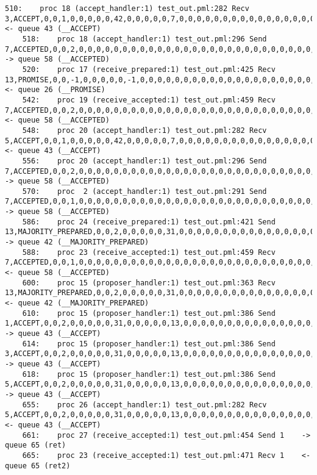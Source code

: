 \begin{lstlisting}[xleftmargin=.01\linewidth, xrightmargin=0.01\linewidth, caption={Message passing caused by the proposer's protocol bug.}, label={lst:paxos_bug}]
    510:    proc 18 (accept_handler:1) test_out.pml:282 Recv 3,ACCEPT,0,0,1,0,0,0,0,0,42,0,0,0,0,0,7,0,0,0,0,0,0,0,0,0,0,0,0,0,0,0,0,0,0,0,0,0      <- queue 43 (__ACCEPT)
    518:    proc 18 (accept_handler:1) test_out.pml:296 Send 7,ACCEPTED,0,0,2,0,0,0,0,0,0,0,0,0,0,0,0,0,0,0,0,0,0,0,0,0,0,0,0,0,0,0,0,0,0,0,0,0     -> queue 58 (__ACCEPTED)
    520:    proc 17 (receive_prepared:1) test_out.pml:425 Recv 13,PROMISE,0,0,-1,0,0,0,0,0,-1,0,0,0,0,0,0,0,0,0,0,0,0,0,0,0,0,0,0,0,0,0,0,0,0,0,0,0 <- queue 26 (__PROMISE)
    542:    proc 19 (receive_accepted:1) test_out.pml:459 Recv 7,ACCEPTED,0,0,2,0,0,0,0,0,0,0,0,0,0,0,0,0,0,0,0,0,0,0,0,0,0,0,0,0,0,0,0,0,0,0,0,0   <- queue 58 (__ACCEPTED)
    548:    proc 20 (accept_handler:1) test_out.pml:282 Recv 5,ACCEPT,0,0,1,0,0,0,0,0,42,0,0,0,0,0,7,0,0,0,0,0,0,0,0,0,0,0,0,0,0,0,0,0,0,0,0,0      <- queue 43 (__ACCEPT)
    556:    proc 20 (accept_handler:1) test_out.pml:296 Send 7,ACCEPTED,0,0,2,0,0,0,0,0,0,0,0,0,0,0,0,0,0,0,0,0,0,0,0,0,0,0,0,0,0,0,0,0,0,0,0,0     -> queue 58 (__ACCEPTED)
    570:    proc  2 (accept_handler:1) test_out.pml:291 Send 7,ACCEPTED,0,0,1,0,0,0,0,0,0,0,0,0,0,0,0,0,0,0,0,0,0,0,0,0,0,0,0,0,0,0,0,0,0,0,0,0     -> queue 58 (__ACCEPTED)
    586:    proc 24 (receive_prepared:1) test_out.pml:421 Send 13,MAJORITY_PREPARED,0,0,2,0,0,0,0,0,31,0,0,0,0,0,0,0,0,0,0,0,0,0,0,0,0,0,0,0,0,0,0,0,0,0,0,0        -> queue 42 (__MAJORITY_PREPARED)
    588:    proc 23 (receive_accepted:1) test_out.pml:459 Recv 7,ACCEPTED,0,0,1,0,0,0,0,0,0,0,0,0,0,0,0,0,0,0,0,0,0,0,0,0,0,0,0,0,0,0,0,0,0,0,0,0   <- queue 58 (__ACCEPTED)
    600:    proc 15 (proposer_handler:1) test_out.pml:363 Recv 13,MAJORITY_PREPARED,0,0,2,0,0,0,0,0,31,0,0,0,0,0,0,0,0,0,0,0,0,0,0,0,0,0,0,0,0,0,0,0,0,0,0,0        <- queue 42 (__MAJORITY_PREPARED)
    610:    proc 15 (proposer_handler:1) test_out.pml:386 Send 1,ACCEPT,0,0,2,0,0,0,0,0,31,0,0,0,0,0,13,0,0,0,0,0,0,0,0,0,0,0,0,0,0,0,0,0,0,0,0,0   -> queue 43 (__ACCEPT)
    614:    proc 15 (proposer_handler:1) test_out.pml:386 Send 3,ACCEPT,0,0,2,0,0,0,0,0,31,0,0,0,0,0,13,0,0,0,0,0,0,0,0,0,0,0,0,0,0,0,0,0,0,0,0,0   -> queue 43 (__ACCEPT)
    618:    proc 15 (proposer_handler:1) test_out.pml:386 Send 5,ACCEPT,0,0,2,0,0,0,0,0,31,0,0,0,0,0,13,0,0,0,0,0,0,0,0,0,0,0,0,0,0,0,0,0,0,0,0,0   -> queue 43 (__ACCEPT)
    655:    proc 26 (accept_handler:1) test_out.pml:282 Recv 5,ACCEPT,0,0,2,0,0,0,0,0,31,0,0,0,0,0,13,0,0,0,0,0,0,0,0,0,0,0,0,0,0,0,0,0,0,0,0,0     <- queue 43 (__ACCEPT)
    661:    proc 27 (receive_accepted:1) test_out.pml:454 Send 1    -> queue 65 (ret)
    665:    proc 23 (receive_accepted:1) test_out.pml:471 Recv 1    <- queue 65 (ret2)

\end{lstlisting}

